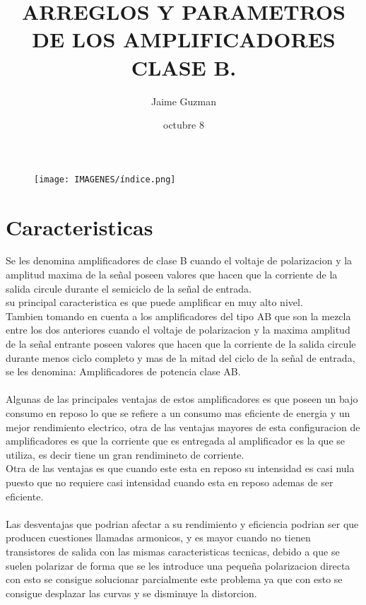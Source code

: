 \documentclass[13pt]{article}
\title{\textbf{ARREGLOS Y PARAMETROS DE LOS AMPLIFICADORES CLASE B.}}
\author{Jaime Guzman}
\begin{document}
\date{octubre 8}
\begin{figure}[htp]
\centering
\texttt{[image: IMAGENES/índice.png]}
\caption{}
\label{}
\end{figure}
\maketitle

\section{Caracteristicas}

Se les denomina amplificadores de clase B cuando el voltaje de polarizacion y la amplitud maxima de la señal poseen valores que hacen que la corriente de la salida circule durante el semiciclo de la señal de entrada.\\
su principal caracteristica es que puede amplificar en muy alto nivel.\\
Tambien tomando en cuenta a los amplificadores del tipo AB que son la mezcla entre los dos anteriores cuando el voltaje de polarizacion y la maxima amplitud de la señal entrante poseen valores que hacen que la corriente de la salida circule durante menos ciclo completo y mas de la mitad del ciclo de la señal de entrada, se les denomina: Amplificadores de potencia clase AB.\\\\

Algunas de las principales ventajas de estos amplificadores es que poseen un bajo consumo en reposo lo que se refiere a un consumo mas eficiente de energia y un mejor rendimiento electrico, otra de las ventajas mayores de esta configuracion de amplificadores es que la corriente que es entregada al amplificador es la que se utiliza, es decir tiene un gran rendimineto de corriente.\\
Otra de las ventajas es que cuando este esta en reposo su intensidad es casi nula puesto que no requiere casi intensidad cuando esta en reposo ademas de ser eficiente.\\\\

Las desventajas que podrian afectar a su rendimiento y eficiencia podrian ser que producen cuestiones llamadas armonicos, y es mayor cuando no tienen transistores de salida con las mismas caracteristicas tecnicas, debido a que se suelen polarizar de forma que se les introduce una pequeña polarizacion directa con esto se consigue solucionar parcialmente este problema ya que con esto se consigue desplazar las curvas y se disminuye la distorcion.\\\\
\end{document}
